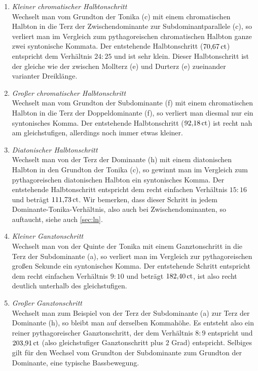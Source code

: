 \begin{enumerate}
\item \emph{Kleiner chromatischer Halbtonschritt}\\
  Wechselt man vom Grundton der Tonika (c) mit einem chromatischen Halbton in
  die Terz der Zwischendominante zur Subdominantparallele (\sharpmm c), so
  verliert man im Vergleich zum pythagoreischen chromatischen Halbton ganze
  zwei syntonische Kommata. Der entstehende Halbtonschritt ($70{,}67\,\text{ct}$)
  entspricht dem Verhältnis $24:25$ und ist sehr klein. Dieser Halbtonschritt
  ist der gleiche wie der zwischen Mollterz (\flatp e) und Durterz
  (\naturalm e) zueinander varianter Dreiklänge.
\item \emph{Großer chromatischer Halbtonschritt}\\
  Wechselt man vom Grundton der Subdominante (f) mit einem chromatischen
  Halbton in die Terz der Doppeldominante (\sharpm f), so verliert man diesmal
  nur ein syntonisches Komma.  Der entstehende Halbtonschritt
  ($92{,}18\,\mathrm{ct}$) ist recht nah am gleichstufigen, allerdings
  noch immer etwas kleiner.\setcounter{enumi}{3}
\item \emph{Diatonischer Halbtonschritt}\\
  Wechselt man von der Terz der Dominante (\naturalm h) mit einem diatonischen
  Halbton in den Grundton der Tonika (c), so gewinnt man im Vergleich zum
  pythagoreischen diatonischen Halbton ein syntonisches Komma.  Der
  entstehende Halbtonschritt entspricht dem recht einfachen Verhältnis $15:16$
  und beträgt $111{,}73\,\text{ct}$.  Wir bemerken, dass dieser Schritt in jedem
  Dominante-Tonika-Verhältnis, also auch bei Zwischendominanten, so auftaucht,
  siehe auch \cref{sec:ln}.
\item \emph{Kleiner Ganztonschritt}\\
  Wechselt man von der Quinte der Tonika mit einem Ganztonschritt in die Terz
  der Subdominante (\naturalm a), so verliert man im Vergleich zur
  pythagoreischen großen Sekunde ein syntonisches Komma. Der entstehende Schritt
  entspricht dem recht einfachen Verhältnis \mbox{$9:10$} und beträgt $182{,}40\,\text{ct}$,
  ist also recht deutlich unterhalb des gleichstufigen.
\item \emph{Großer Ganztonschritt}\\
  Wechselt man zum Beispiel von der Terz der Subdominante (\naturalm a) zur Terz
  der Dominante (\naturalm h), so bleibt man auf derselben Kommahöhe. Es
  entsteht also ein reiner pythagoreischer Ganztonschritt, der dem Verhältnis
  $8:9$ entspricht und $203{,}91\,\text{ct}$ (also gleichstufiger Ganztonschritt plus
  $2$ Grad) entspricht.  Selbiges gilt für den Wechsel vom Grundton der
  Subdominante zum Grundton der Dominante, eine typische Bassbewegung.
\end{enumerate}

